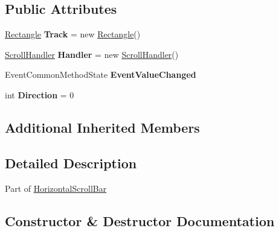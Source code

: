 \subsection*{Public Attributes}
\begin{DoxyCompactItemize}
\item 
\mbox{\label{class_space_v_i_l_1_1_horizontal_slider_aa72646a82b35d8b489d1b987cab1e762}} 
\mbox{\hyperlink{class_space_v_i_l_1_1_rectangle}{Rectangle}} {\bfseries Track} = new \mbox{\hyperlink{class_space_v_i_l_1_1_rectangle}{Rectangle}}()
\item 
\mbox{\label{class_space_v_i_l_1_1_horizontal_slider_a4942181895d7179ca2468b4c8d8f9c08}} 
\mbox{\hyperlink{class_space_v_i_l_1_1_scroll_handler}{Scroll\+Handler}} {\bfseries Handler} = new \mbox{\hyperlink{class_space_v_i_l_1_1_scroll_handler}{Scroll\+Handler}}()
\item 
\mbox{\label{class_space_v_i_l_1_1_horizontal_slider_ac1943276ef4514830f20e7b39f4ab432}} 
Event\+Common\+Method\+State {\bfseries Event\+Value\+Changed}
\item 
\mbox{\label{class_space_v_i_l_1_1_horizontal_slider_a707283159cd6c072bff6ade84ac3a601}} 
int {\bfseries Direction} = 0
\end{DoxyCompactItemize}
\subsection*{Additional Inherited Members}


\subsection{Detailed Description}
Part of \mbox{\hyperlink{class_space_v_i_l_1_1_horizontal_scroll_bar}{Horizontal\+Scroll\+Bar}} 



\subsection{Constructor \& Destructor Documentation}
\mbox{\label{class_space_v_i_l_1_1_horizontal_slider_ae040dcab9cc4d7c00b949b47adc0eeb5}} 
